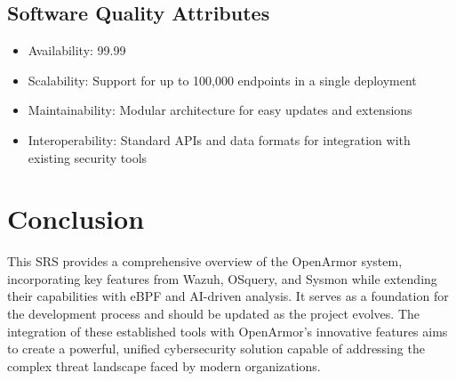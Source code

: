 \subsection{Software Quality Attributes}
\begin{itemize}
    \item Availability: 99.99%
    \item Scalability: Support for up to 100,000 endpoints in a single deployment
    \item Maintainability: Modular architecture for easy updates and extensions
    \item Interoperability: Standard APIs and data formats for integration with existing security tools
\end{itemize}

\section{Conclusion}
This SRS provides a comprehensive overview of the OpenArmor system, incorporating key features from Wazuh, OSquery, and Sysmon while extending their capabilities with eBPF and AI-driven analysis. It serves as a foundation for the development process and should be updated as the project evolves. The integration of these established tools with OpenArmor's innovative features aims to create a powerful, unified cybersecurity solution capable of addressing the complex threat landscape faced by modern organizations.